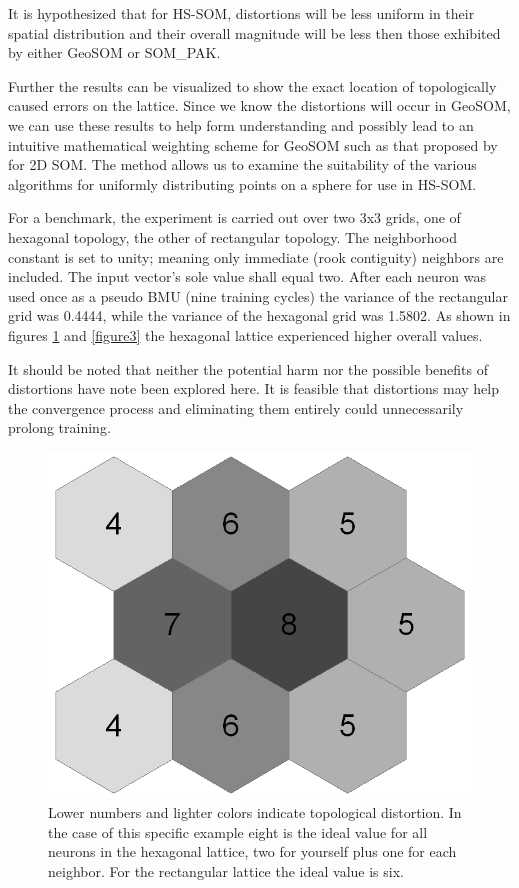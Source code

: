 \documentclass[11pt]{article}
\begin{document}
It is hypothesized that for HS-SOM, distortions will be less uniform in their spatial
distribution and their overall magnitude will be less then those exhibited by
either GeoSOM or SOM\_PAK.

Further the results can be visualized to show the exact location of
topologically caused errors on the lattice.  Since we know the distortions
will occur in GeoSOM, we can use these results to help form understanding and
possibly lead to an intuitive mathematical weighting scheme for GeoSOM such as
that proposed by \cite{Kohonen2000} for 2D SOM. The method allows us to
examine the suitability of the various algorithms for uniformly distributing
points on a sphere for use in HS-SOM.

For a benchmark, the experiment is carried out over two 3x3 grids, one of
hexagonal topology, the other of rectangular topology. The neighborhood
constant is set to unity; meaning only immediate (rook contiguity) neighbors
are included. The input vector's sole value shall equal two. After each
neuron was used once as a pseudo BMU (nine training cycles) the variance of
the rectangular grid was 0.4444, while the variance of the hexagonal grid was
1.5802. As shown in figures \ref{figure2} and \ref{figure3} the hexagonal lattice
experienced higher overall values.

It should be noted that neither the potential harm nor the possible benefits
of distortions have note been explored here.  It is feasible that distortions
may help the convergence process and eliminating them entirely could
unnecessarily prolong training.

\begin{figure}
\centering
\includegraphics[width=0.4\linewidth]{figure_hex.png}
\caption{Lower numbers and lighter colors indicate topological distortion.
In the case of this specific example eight is the ideal value for all neurons
in the hexagonal lattice, two for yourself plus one for each neighbor.  For
the rectangular lattice the ideal value is six.}
\label{figure2}
\end{figure}
\end{document}
